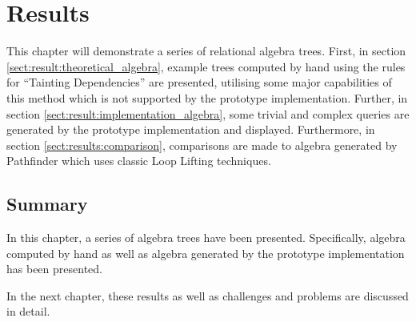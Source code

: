 \chapter{Results}
\label{chapter:results}
This chapter will demonstrate a series of relational algebra trees. First, in
section \ref{sect:result:theoretical_algebra}, example trees computed by hand
using the rules for ``Tainting Dependencies'' are presented, utilising
some major capabilities of this method which is not supported by the prototype
implementation. Further, in section \ref{sect:result:implementation_algebra},
some trivial and complex queries are generated by the prototype implementation
and displayed. Furthermore, in section \ref{sect:results:comparison},
comparisons are made to algebra generated by Pathfinder which uses classic
Loop Lifting techniques.




\section{Summary}
\label{sect:res:summary}
In this chapter, a series of algebra trees have been presented. Specifically,
algebra computed by hand as well as algebra generated by the prototype
implementation has been presented. 

In the next chapter, these results as well as challenges and problems are
discussed in detail.
